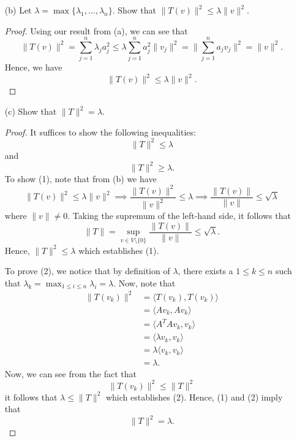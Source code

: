 \documentclass[a4paper]{article}
\begin{document}
\begin{enumerate}
\begin{enumerate}
\begin{proof}
\begin{align*}
                    \end{align*}
                    Hence, we conclude that 
                    \[  \|T(v)\|^{2} = \sum_{ j=1  }^{ n } {\lambda}_{j} {a}_{j}^{2}. \]
                \end{proof}
        \item[(b)] Let \( \lambda = \max \{  {\lambda}_{1}, \dots, {\lambda}_{n} \}  \). Show that \( \|T(v)\|^{2} \leq \lambda \|v\|^{2}.  \)
        \begin{proof}
        Using our result from (a), we can see that 
        \[  \|T(v)\|^{2} = \sum_{ j=1  }^{ n } {\lambda}_{j} {a}_{j}^{2} \leq \lambda \sum_{ j=1  }^{ n } {a}_{j}^{2} \|{v}_{j}\|^{2} = \Big\|\sum_{ j=1  }^{ n } {a}_{j} {v}_{j} \Big\|^{2} =  \|v\|^{2}.  \]
        Hence, we have 
        \[  \|T(v)\|^{2} \leq \lambda \|v\|^{2}. \]
        \end{proof}
        \item[(c)] Show that \( \|T\|^{2} = \lambda \).
            \begin{proof}
            It suffices to show the following inequalities:
            \[  \|T\|^{2} \leq \lambda \tag{1} \]
            and 
            \[  \|T\|^{2} \geq \lambda \tag{2}.  \]
            To show (1), note that from (b) we have 
            \[  \|T(v)\|^{2} \leq \lambda \|v\|^{2} \implies \frac{ \|T(v)\|^{2} }{  \|v\|^{2} } \leq \lambda \implies \frac{ \|T(v)\| }{ \|v\| } \leq \sqrt{ \lambda } \]
            where \( \|v\| \neq 0  \).
            Taking the supremum of the left-hand side, it follows that 
            \[  \|T\| =  \sup_{v \in V \setminus  \{ 0 \}  } \frac{ \|T(v)\| }{ \|v\| } \leq \sqrt{ \lambda }.   \]
            Hence, \( \|T\|^{2} \leq \lambda  \) which establishes (1).

            To prove (2), we notice that by definition of \( \lambda  \), there exists a \( 1 \leq k \leq n  \) such that             \( {\lambda}_{k} = \max_{1 \leq i \leq n } {\lambda}_{i} = \lambda \). Now, note that 
            \begin{align*}
                \|T({v}_{k})\|^{2} &= \langle T({v}_{k}) , T({v}_{k})  \rangle  \\
                                   &= \langle A {v}_{k} , A {v}_{k} \rangle \\
                                   &= \langle A^{T} A {v}_{k} ,  {v}_{k} \rangle \\
                                   &= \langle \lambda {v}_{k} , {v}_{k} \rangle \\
                                   &= \lambda \langle {v}_{k} , {v}_{k} \rangle \\
                                   &= \lambda.
            \end{align*}
            Now, we can see from the fact that
            \[  \|T({v}_{k})\|^{2} \leq \|T\|^{2} \]
            it follows that \( \lambda \leq \|T\|^{2} \) which establishes (2). Hence, (1) and (2) imply that 
            \[  \|T\|^{2} = \lambda. \]


\end{proof}
\end{enumerate}
\end{enumerate}
\end{document}

